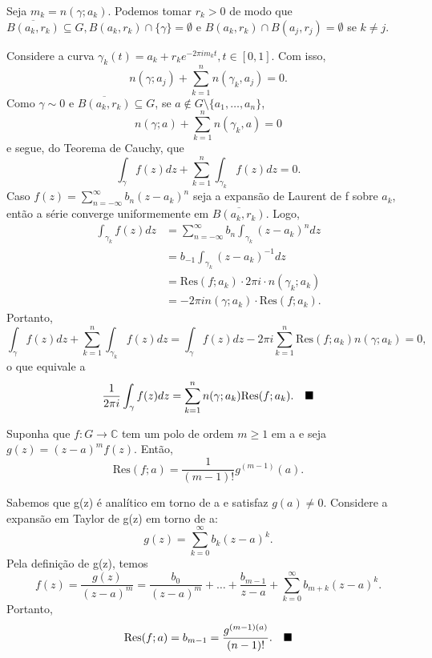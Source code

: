 \documentclass[ComplexAnalysis/complex.tex]{subfiles}
\begin{document}
\begin{proof*}
	Seja \(m_{k} = n(\gamma ; a_{k}).\) Podemos tomar \(r_{k}>0\) de modo que \(\overline{B(a_{k}, r_{k})}\subseteq G, B(a_{k}, r_{k})\cap\{\gamma \}=\emptyset \) e
	\(B(a_{k}, r_{k})\cap B(a_{j}, r_{j}) = \emptyset \) se \(k\neq j\).

	Considere a curva \(\gamma_{k}(t) = a_{k} + r_{k}e^{-2\pi i m_{k}t},t\in[0, 1].\) Com isso,
	\[
		n(\gamma ; a_{j}) + \sum\limits_{k=1}^{n}n(\gamma_{k}, a_{j}) = 0.
	\]
	Como \(\gamma \sim 0\) e \(\overline{B(a_{k}, r_{k})}\subseteq G\), se \(a\not\in G\setminus{\{a_{1},\dotsc ,a_{n}\}}\),
	\[
		n(\gamma ; a) + \sum\limits_{k=1}^{n}n(\gamma_{k}, a) = 0
	\]
	e segue, do Teorema de Cauchy, que
	\[
		\int_{\gamma }^{}f(z)dz + \sum\limits_{k=1}^{n}\int_{\gamma_{k}}^{}f(z)dz = 0.
	\]
	Caso \(f(z) = \sum\limits_{n=-\infty}^{\infty}b_{n}(z-a_{k})^{n}\) seja a expansão de Laurent de f sobre \(a_{k}\), então a série converge uniformemente
	em \(\overline{B(a_{k}, r_{k})}.\) Logo,
	\begin{align*}
		\int_{\gamma_{k}}^{}f(z)dz & = \sum\limits_{n=-\infty}^{\infty}b_{n}\int_{\gamma_{k}}^{}(z-a_{k})^{n}dz \\
		                           & = b_{-1}\int_{\gamma_{k}}^{}(z-a_{k})^{-1}dz                               \\
		                           & = \mathrm{Res}(f; a_{k})\cdot 2\pi i \cdot n(\gamma_{k}; a_{k})            \\
		                           & = -2\pi i n(\gamma ; a_{k})\cdot \mathrm{Res}(f; a_{k}).
	\end{align*}
	Portanto,
	\[
		\int_{\gamma }^{}f(z)dz + \sum\limits_{k=1}^{n}\int_{\gamma_{k}}^{}f(z)dz = \int_{\gamma }^{}f(z)dz - 2\pi i \sum\limits_{k=1}^{n}\mathrm{Res}(f; a_{k})n(\gamma ; a_{k}) = 0,
	\]
	o que equivale a
	\[
		\frac{1}{2\pi i}\int_{\gamma }^{}f(z)dz = \sum\limits_{k=1}^{n}n(\gamma ; a_{k})\mathrm{Res}(f; a_{k}).\quad \text{$\blacksquare$}
	\]
\end{proof*}
\begin{prop*}
	Suponha que \(f:G\rightarrow \mathbb{C}\) tem um polo de ordem \(m \geq 1\) em a e seja \(g(z) = (z-a)^{m}f(z).\) Então,
	\[
		\mathrm{Res}(f; a) = \frac{1}{(m-1)!}g^{(m-1)}(a).
	\]
\end{prop*}
\begin{proof*}
	Sabemos que g(z) é analítico em torno de a e satisfaz \(g(a)\neq 0.\) Considere a expansão em Taylor de g(z) em torno de a:
	\[
		g(z) = \sum\limits_{k=0}^{\infty}b_{k}(z-a)^{k}.
	\]
	Pela definição de g(z), temos
	\[
		f(z) = \frac{g(z)}{(z-a)^{m}} = \frac{b_{0}}{(z-a)^{m}} + \dotsc + \frac{b_{m-1}}{z-a} + \sum\limits_{k=0}^{\infty}b_{m+k}(z-a)^{k}.
	\]
	Portanto,
	\[
		\mathrm{Res}(f; a) = b_{m-1} = \frac{g^{(m-1)(a)}}{(n-1)!}.\quad \text{$\blacksquare$}
	\]
\end{proof*}
\end{document}
